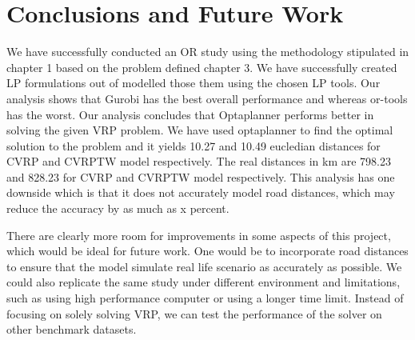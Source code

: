 \chapter{Conclusions and Future Work}
We have successfully conducted an OR study using the methodology stipulated in chapter 1 based on the problem defined chapter 3.
We have successfully created LP formulations out of modelled those them using
 the chosen LP tools. Our analysis shows that Gurobi has the best overall performance and whereas or-tools has the worst.
 Our analysis concludes that Optaplanner performs better in solving the given VRP problem. We have used optaplanner to find
 the optimal solution to the problem and it yields 10.27 and 10.49 eucledian distances for CVRP and CVRPTW model
 respectively. The real distances in km are 798.23 and 828.23 for CVRP and CVRPTW model respectively.  This analysis
 has one downside which is that it does not accurately model road distances, which may reduce the accuracy by as much
 as x percent.

There are clearly more room for improvements in some aspects of this project, which would be ideal for future work.
One would be to incorporate road distances to ensure that the model simulate real life scenario as accurately as
possible. We could also replicate the same study under different environment and limitations, such as using high performance
computer or using a longer time limit. Instead of focusing on solely solving VRP, we can test the performance of the solver
on other benchmark datasets.